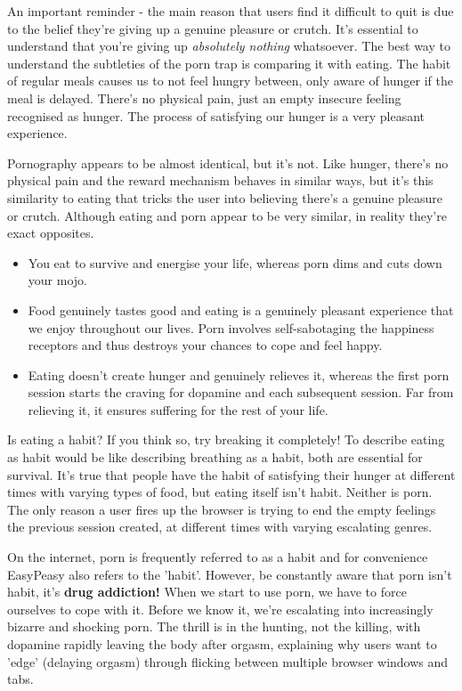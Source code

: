 \documentclass[
]{book}
\begin{document}
An important reminder - the main reason that users find it difficult to quit is due to the belief they're giving up a genuine pleasure or crutch. It's essential to understand that you're giving up \emph{absolutely nothing} whatsoever. The best way to understand the subtleties of the porn trap is comparing it with eating. The habit of regular meals causes us to not feel hungry between, only aware of hunger if the meal is delayed. There's no physical pain, just an empty insecure feeling recognised as hunger. The process of satisfying our hunger is a very pleasant experience.

Pornography appears to be almost identical, but it's not. Like hunger, there's no physical pain and the reward mechanism behaves in similar ways, but it's this similarity to eating that tricks the user into believing there's a genuine pleasure or crutch. Although eating and porn appear to be very similar, in reality they're exact opposites.

\begin{itemize}
\item
  You eat to survive and energise your life, whereas porn dims and cuts down your mojo.
\item
  Food genuinely tastes good and eating is a genuinely pleasant experience that we enjoy throughout our lives. Porn involves self-sabotaging the happiness receptors and thus destroys your chances to cope and feel happy.
\item
  Eating doesn't create hunger and genuinely relieves it, whereas the first porn session starts the craving for dopamine and each subsequent session. Far from relieving it, it ensures suffering for the rest of your life.
\end{itemize}

Is eating a habit? If you think so, try breaking it completely! To describe eating as habit would be like describing breathing as a habit, both are essential for survival. It's true that people have the habit of satisfying their hunger at different times with varying types of food, but eating itself isn't habit. Neither is porn. The only reason a user fires up the browser is trying to end the empty feelings the previous session created, at different times with varying escalating genres.

On the internet, porn is frequently referred to as a habit and for convenience EasyPeasy also refers to the 'habit'. However, be constantly aware that porn isn't habit, it's \textbf{drug addiction!} When we start to use porn, we have to force ourselves to cope with it. Before we know it, we're escalating into increasingly bizarre and shocking porn. The thrill is in the hunting, not the killing, with dopamine rapidly leaving the body after orgasm, explaining why users want to 'edge' (delaying orgasm) through flicking between multiple browser windows and tabs.
\end{document}
